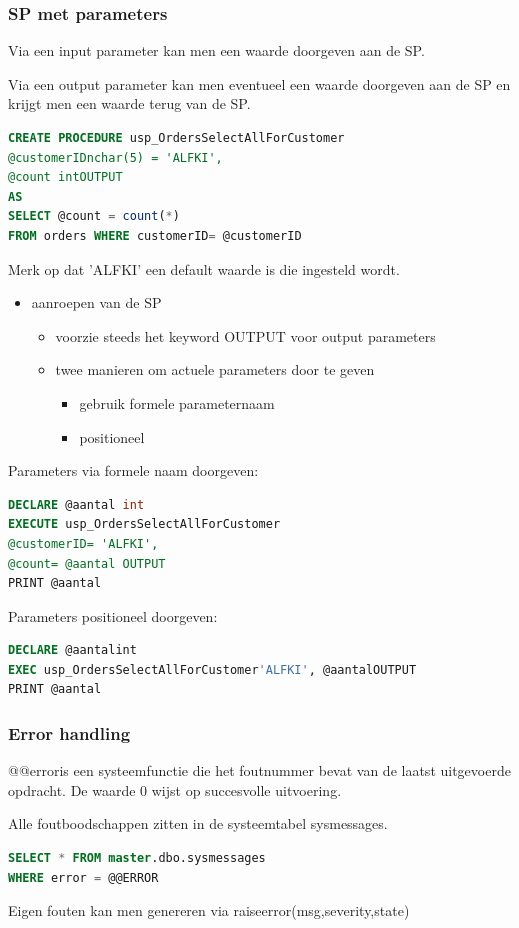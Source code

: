 \documentclass[a4paper,12pt]{article}
\begin{document}
\subsubsection{SP met parameters}
Via een input parameter kan men een waarde doorgeven aan de SP.

Via een output parameter kan men eventueel een waarde doorgeven aan de SP en krijgt men een waarde terug van de SP.

\begin{lstlisting}[language=sql, breaklines=true]
CREATE PROCEDURE usp_OrdersSelectAllForCustomer
@customerIDnchar(5) = 'ALFKI',
@count intOUTPUT
AS
SELECT @count = count(*)
FROM orders WHERE customerID= @customerID
\end{lstlisting}
Merk op dat 'ALFKI' een default waarde is die ingesteld wordt.

\begin{itemize}
\item aanroepen van de SP
	\begin{itemize}
	\item voorzie steeds het keyword OUTPUT voor output parameters
	\item twee manieren om actuele parameters door te geven
		\begin{itemize}
		\item gebruik formele parameternaam
		\item positioneel
		\end{itemize}
	\end{itemize}
\end{itemize}

Parameters via formele naam doorgeven:
\begin{lstlisting}[language=sql, breaklines=true]
DECLARE @aantal int
EXECUTE usp_OrdersSelectAllForCustomer
@customerID= 'ALFKI',
@count= @aantal OUTPUT
PRINT @aantal
\end{lstlisting}

Parameters positioneel doorgeven:
\begin{lstlisting}[language=sql, breaklines=true]
DECLARE @aantalint
EXEC usp_OrdersSelectAllForCustomer'ALFKI', @aantalOUTPUT
PRINT @aantal
\end{lstlisting}

\subsubsection{Error handling}
@@erroris een systeemfunctie die het foutnummer bevat van de laatst uitgevoerde opdracht. De waarde 0 wijst op succesvolle uitvoering.

Alle foutboodschappen zitten in de systeemtabel sysmessages.
\begin{lstlisting}[language=sql, breaklines=true]
SELECT * FROM master.dbo.sysmessages
WHERE error = @@ERROR
\end{lstlisting}
Eigen fouten kan men genereren via raiseerror(msg,severity,state)
\end{document}
